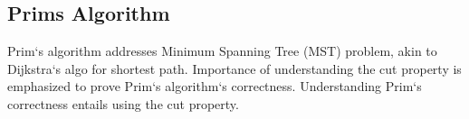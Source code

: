 \subsection*{Prims Algorithm}
Prim`s algorithm addresses Minimum Spanning Tree (MST) problem, akin to Dijkstra`s algo for shortest path.
Importance of understanding the cut property is emphasized to prove Prim`s algorithm`s correctness.
Understanding Prim`s correctness entails using the cut property.

